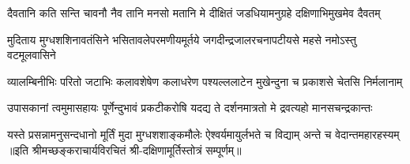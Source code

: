 \fourlineindentedshloka
{दैवतानि कति सन्ति चावनौ}
{नैव तानि मनसो मतानि मे}
{दीक्षितं जडधियामनुग्रहे}
{दक्षिणाभिमुखमेव दैवतम्}

\fourlineindentedshloka
{मुदिताय मुग्धशशिनावतंसिने}
{भसितावलेपरमणीयमूर्तये}
{जगदीन्द्रजालरचनापटीयसे}
{महसे नमोऽस्तु वटमूलवासिने}

\fourlineindentedshloka
{व्यालम्बिनीभिः परितो जटाभिः}
{कलावशेषेण कलाधरेण}
{पश्यल्ललाटेन मुखेन्दुना च}
{प्रकाशसे चेतसि निर्मलानाम्}

\fourlineindentedshloka
{उपासकानां त्वमुमासहायः}
{पूर्णेन्दुभावं प्रकटीकरोषि}
{यदद्य ते दर्शनमात्रतो मे}
{द्रवत्यहो मानसचन्द्रकान्तः}

\fourlineindentedshloka
{यस्ते प्रसन्नामनुसन्दधानो}
{मूर्तिं मुदा मुग्धशशाङ्कमौलेः}
{ऐश्वर्यमायुर्लभते च विद्याम्}
{अन्ते च वेदान्तमहारहस्यम्}
॥इति श्रीमच्छङ्कराचार्यविरचितं श्री-दक्षिणामूर्तिस्तोत्रं सम्पूर्णम्॥